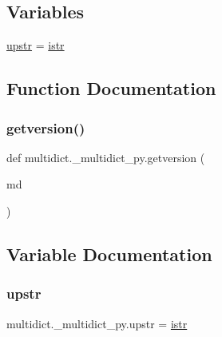 \subsection*{Variables}
\begin{DoxyCompactItemize}
\item 
\hyperlink{namespacemultidict_1_1__multidict__py_a46011dd19e3d3ae810d1babe2fa3da77}{upstr} = \hyperlink{classmultidict_1_1__multidict__py_1_1istr}{istr}
\end{DoxyCompactItemize}


\subsection{Function Documentation}
\mbox{\label{namespacemultidict_1_1__multidict__py_a847acfaabf12fc813ab3ca7943043227}} 
\subsubsection{\texorpdfstring{getversion()}{getversion()}}
{\footnotesize\ttfamily def multidict.\+\_\+multidict\+\_\+py.\+getversion (\begin{DoxyParamCaption}\item[{}]{md }\end{DoxyParamCaption})}



\subsection{Variable Documentation}
\mbox{\label{namespacemultidict_1_1__multidict__py_a46011dd19e3d3ae810d1babe2fa3da77}} 
\subsubsection{\texorpdfstring{upstr}{upstr}}
{\footnotesize\ttfamily multidict.\+\_\+multidict\+\_\+py.\+upstr = \hyperlink{classmultidict_1_1__multidict__py_1_1istr}{istr}}

